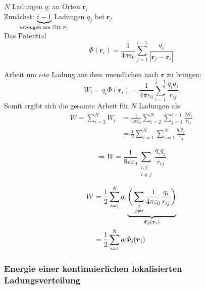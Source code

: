 \documentclass[titlepage,11pt,a4paper,ngerman]{report}
\renewcommand{\Phi}{\varPhi}
\newcommand{\kq}{\frac{1}{4\pi\epsilon_0}}
\newcommand{\summ}[2]{\sum_{#1}^{#2}}
\renewcommand{\vec}[1]{\boldsymbol{#1}}
\renewcommand{\epsilon}{\varepsilon}
\renewcommand{\paragraph}[1]{\subsubsection{#1}}
\begin{document}
$N$ Ladungen $q$: an Orten $\vec{r}_i$\\
Zunächst: $\underbrace{i - 1}_{\mathclap{\textrm{erzeugen am Ort } \vec{r}_i}}$ Ladungen $q_j$ bei $\vec{r}_j$\\
Das Potential
$$\Phi(\vec{r}_i) = \kq \summ{j = 1}{i - 1} \frac{q_i}{|\vec{r}_j - \vec{r}_i|}$$ 


Arbeit um $ i $-te Ladung aus dem unendlichen nach $ \vec{r} $ zu bringen:
\begin{equation*}
W_i = q_i \Phi(\vec{r}_i) = \frac{1}{4 \pi \epsilon_0} \sum_{i=1}^{j-1} \frac{q_i q_j}{r_{ij}}
\end{equation*}
Somit ergibt sich die gesamte Arbeit für $ N $ Ladungen als:
\begin{align*}
W = \sum_{i=2}^{N} W_i &= \frac{1}{4 \pi \epsilon_0} \sum_{i=2}^{N} \sum_{j=1}^{i-1} \frac{q_i q_j}{r_{ij}}\\
&= \frac{1}{2} \sum_{i=1}^{N} \sum_{i=1}^{N} \frac{q_i q_j}{r_{ij}}
\end{align*}

\begin{equation*}
\Rightarrow W = \frac{1}{8 \pi \epsilon_0} \sum_{\substack{i,j\\i\neq j}} \frac{q_i q_j}{r_{ij}}
\end{equation*}

\begin{align*}
W &= \frac{1}{2} \summ{i = 1}{N} q_i \underbrace{\bigg( \sum_{\substack{j\\ j \neq i}} \kq \frac{q_i}{r_{ij}}\bigg)}_{\Phi_{/ \hspace{-3.5pt}i}(\vec{r}_i)}\\
&= \frac{1}{2} \summ{i = 1}{N} q_i \Phi_{/ \hspace{-4pt}i}(\vec{r}_i)
\end{align*}

\paragraph{Energie einer kontinuierlichen lokalisierten Ladungsverteilung}
\end{document}

